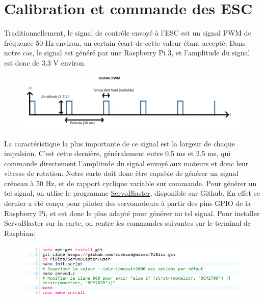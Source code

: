 \documentclass[a4paper,11pt]{report}
\begin{document}
				\newpage\section{Calibration et commande des ESC}
				
				Traditionnellement, le signal de contrôle envoyé à l'ESC est un signal PWM de fréquence 50 Hz environ, un certain écart de cette valeur étant accepté. Dans notre cas, le signal est généré par une Raspberry Pi 3, et l'amplitude du signal est donc de 3,3 V environ.
				\begin{figure}[!h]
				  \begin{center}
				  	\includegraphics[scale=0.6]{Photos/signal_pwm}
				  \end{center}
		  	\end{figure}
				\newline\newline La caractéristique la plus importante de ce signal est la largeur de chaque impulsion. C'est cette dernière, généralement entre 0.5 ms et 2.5 ms, qui commande directement l'amplitude du signal envoyé aux moteurs et donc leur vitesse de rotation. Notre carte doit donc être capable de générer un signal créneau à 50 Hz, et de rapport cyclique variable sur commande. Pour générer un tel signal, on utlise le programme \href{https://github.com/richardghirst/PiBits/tree/master/ServoBlaster}{ServoBlaster}, disponible sur Github. En effet ce dernier a été conçu pour piloter des servomoteurs à partir des pins GPIO de la Raspberry Pi, et est donc le plus adapté pour générer un tel signal. Pour installer ServoBlaster sur la carte, on rentre les commandes suivantes sur le terminal de Raspbian:
				\begin{figure}[!h]
				  \begin{center}
				  	\includegraphics[scale=1]{Photos/ServoBlaster}
				  \end{center}
		  	\end{figure}
				
\end{document}
